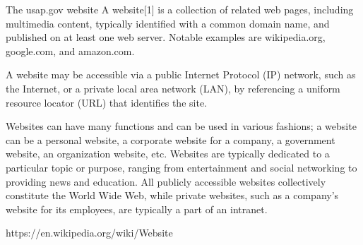 The usap.gov website
A website[1] is a collection of related web pages, including multimedia content, typically identified with a common domain name, and published on at least one web server. Notable examples are wikipedia.org, google.com, and amazon.com.

A website may be accessible via a public Internet Protocol (IP) network, such as the Internet, or a private local area network (LAN), by referencing a uniform resource locator (URL) that identifies the site.

Websites can have many functions and can be used in various fashions; a website can be a personal website, a corporate website for a company, a government website, an organization website, etc. Websites are typically dedicated to a particular topic or purpose, ranging from entertainment and social networking to providing news and education. All publicly accessible websites collectively constitute the World Wide Web, while private websites, such as a company's website for its employees, are typically a part of an intranet.

https://en.wikipedia.org/wiki/Website